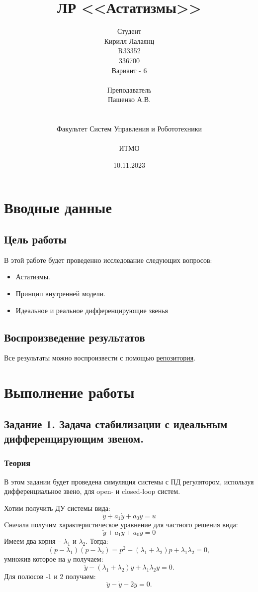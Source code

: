 \documentclass[16pt]{article}
\title{ЛР \textnumero 4 <<Астатизмы>>}
\author{
Студент \\
Кирилл Лалаянц\\
R33352\\
336700\\
Вариант - 6\\
\\
Преподаватель\\
Пашенко А.В. \\
\\
\\
Факультет Систем Управления и Робототехники\\
\\
ИТМО\\
}
\date{10.11.2023}
\begin{document}
\maketitle
\newpage
\tableofcontents
\thispagestyle{empty}

\newpage
\setcounter{page}{1}
\section{Вводные данные}
\subsection{Цель работы}
В этой работе будет проведенно исследование следующих вопросов:
\begin{itemize}
    \item Астатизмы.
    \item Принцип внутренней модели.
    \item Идеальное и реальное дифференцирующие звенья
\end{itemize} 

\subsection{Воспроизведение результатов}
Все результаты можно воспроизвести с помощью \href{https://github.com/lalayants/control-theory-itmo-2023}{репозитория}.

\newpage
\section{Выполнение работы}
\label{sec:headings}


\subsection{Задание 1. Задача стабилизации с идеальным дифференцирующим звеном.}

\subsubsection{Теория}
В этом задании будет проведена симуляция системы с ПД регулятором, используя дифференциальное звено, для open- и closed-loop систем.

Хотим получить ДУ системы вида:
\[\ddot{y} + a_1\dot{y} + a_0y = u\]
Cначала получим характеристическое уравнение для частного решения вида:
\[\ddot{y} + a_1\dot{y} + a_0y = 0\]
Имеем два корня -- \(\lambda_1\) и \(\lambda_2\). Тогда:
\[ (p - \lambda_1)(p-\lambda_2) = p^2 - (\lambda_1 + \lambda_2)p + \lambda_1\lambda_2 = 0,\]
умножив которое на \(y\) получаем:
\[\ddot{y} - (\lambda_1 + \lambda_2)\dot{y} + \lambda_1\lambda_2y = 0.\]
Для полюсов -1 и 2 получаем:
\[\ddot{y} - \dot{y} - 2y = 0.\]
\end{document}
